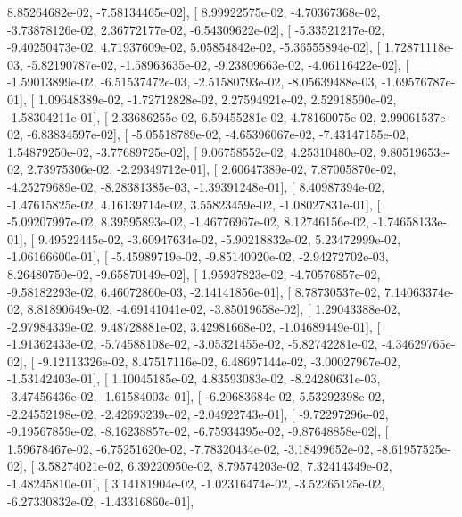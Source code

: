 \documentclass{article}
\begin{document}
          8.85264682e-02,  -7.58134465e-02],
       [  8.99922575e-02,  -4.70367368e-02,  -3.73878126e-02,
          2.36772177e-02,  -6.54309622e-02],
       [ -5.33521217e-02,  -9.40250473e-02,   4.71937609e-02,
          5.05854842e-02,  -5.36555894e-02],
       [  1.72871118e-03,  -5.82190787e-02,  -1.58963635e-02,
         -9.23809663e-02,  -4.06116422e-02],
       [ -1.59013899e-02,  -6.51537472e-03,  -2.51580793e-02,
         -8.05639488e-03,  -1.69576787e-01],
       [  1.09648389e-02,  -1.72712828e-02,   2.27594921e-02,
          2.52918590e-02,  -1.58304211e-01],
       [  2.33686255e-02,   6.59455281e-02,   4.78160075e-02,
          2.99061537e-02,  -6.83834597e-02],
       [ -5.05518789e-02,  -4.65396067e-02,  -7.43147155e-02,
          1.54879250e-02,  -3.77689725e-02],
       [  9.06758552e-02,   4.25310480e-02,   9.80519653e-02,
          2.73975306e-02,  -2.29349712e-01],
       [  2.60647389e-02,   7.87005870e-02,  -4.25279689e-02,
         -8.28381385e-03,  -1.39391248e-01],
       [  8.40987394e-02,  -1.47615825e-02,   4.16139714e-02,
          3.55823459e-02,  -1.08027831e-01],
       [ -5.09207997e-02,   8.39595893e-02,  -1.46776967e-02,
          8.12746156e-02,  -1.74658133e-01],
       [  9.49522445e-02,  -3.60947634e-02,  -5.90218832e-02,
          5.23472999e-02,  -1.06166600e-01],
       [ -5.45989719e-02,  -9.85140920e-02,  -2.94272702e-03,
          8.26480750e-02,  -9.65870149e-02],
       [  1.95937823e-02,  -4.70576857e-02,  -9.58182293e-02,
          6.46072860e-03,  -2.14141856e-01],
       [  8.78730537e-02,   7.14063374e-02,   8.81890649e-02,
         -4.69141041e-02,  -3.85019658e-02],
       [  1.29043388e-02,  -2.97984339e-02,   9.48728881e-02,
          3.42981668e-02,  -1.04689449e-01],
       [ -1.91362433e-02,  -5.74588108e-02,  -3.05321455e-02,
         -5.82742281e-02,  -4.34629765e-02],
       [ -9.12113326e-02,   8.47517116e-02,   6.48697144e-02,
         -3.00027967e-02,  -1.53142403e-01],
       [  1.10045185e-02,   4.83593083e-02,  -8.24280631e-03,
         -3.47456436e-02,  -1.61584003e-01],
       [ -6.20683684e-02,   5.53292398e-02,  -2.24552198e-02,
         -2.42693239e-02,  -2.04922743e-01],
       [ -9.72297296e-02,  -9.19567859e-02,  -8.16238857e-02,
         -6.75934395e-02,  -9.87648858e-02],
       [  1.59678467e-02,  -6.75251620e-02,  -7.78320434e-02,
         -3.18499652e-02,  -8.61957525e-02],
       [  3.58274021e-02,   6.39220950e-02,   8.79574203e-02,
          7.32414349e-02,  -1.48245810e-01],
       [  3.14181904e-02,  -1.02316474e-02,  -3.52265125e-02,
         -6.27330832e-02,  -1.43316860e-01],
\end{document}
